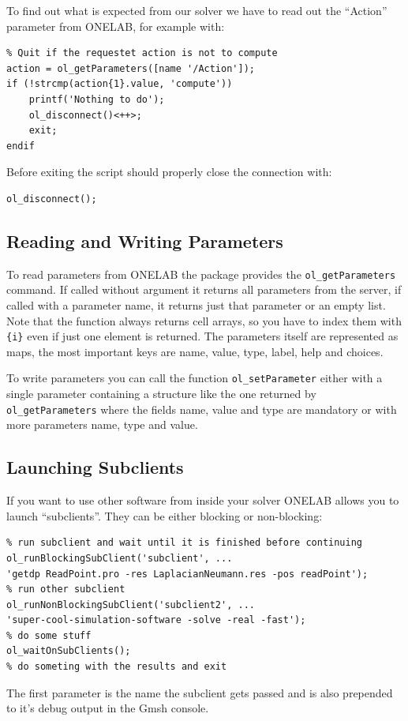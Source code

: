 \documentclass[article,english,colorback,accentcolor=tud9b,11pt]{tudreport}
\begin{document}
		To find out what is expected from our solver we have to read out the ``Action'' parameter from ONELAB, for example with:
		\begin{lstlisting} 
% Quit if the requestet action is not to compute
action = ol_getParameters([name '/Action']);
if (!strcmp(action{1}.value, 'compute'))
	printf('Nothing to do');
	ol_disconnect()<++>;
	exit;
endif
		\end{lstlisting}
		Before exiting the script should properly close the connection with:
		\begin{lstlisting} 
ol_disconnect();
		\end{lstlisting}

		\subsection{Reading and Writing Parameters}
		To read parameters from ONELAB the package provides the \texttt{ol\_getParameters} command. If called without argument it returns all parameters from the server, if called with a parameter name, it returns just that parameter or an empty list. Note that the function always returns cell arrays, so you have to index them with \texttt{\{i\}} even if just one element is returned. The parameters itself are represented as maps, the most important keys are name, value, type, label, help and choices.

		To write parameters you can call the function \texttt{ol\_setParameter} either with a single parameter containing a structure like the one returned by \texttt{ol\_getParameters} where the fields name, value and type are mandatory or with more parameters name, type and value.
		\subsection{Launching Subclients}
		If you want to use other software from inside your solver ONELAB allows you to launch ``subclients''. They can be either blocking or non-blocking:
		\begin{lstlisting} 
% run subclient and wait until it is finished before continuing
ol_runBlockingSubClient('subclient', ...
'getdp ReadPoint.pro -res LaplacianNeumann.res -pos readPoint');
% run other subclient
ol_runNonBlockingSubClient('subclient2', ...
'super-cool-simulation-software -solve -real -fast');
% do some stuff
ol_waitOnSubClients();
% do someting with the results and exit
		\end{lstlisting}
		The first parameter is the name the subclient gets passed and is also prepended to it's debug output in the Gmsh console.
\end{document}
